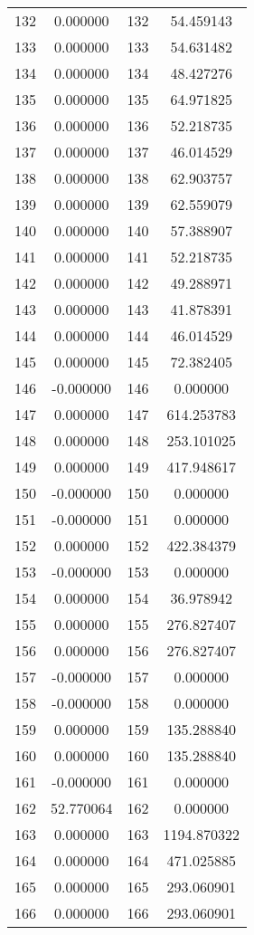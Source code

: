 \documentclass[12pt]{article}
\begin{document}
\begin{longtable}{@{}cccc@{}}
132 & 0.000000 & 132 & 54.459143 \\
133 & 0.000000 & 133 & 54.631482 \\
134 & 0.000000 & 134 & 48.427276 \\
135 & 0.000000 & 135 & 64.971825 \\
136 & 0.000000 & 136 & 52.218735 \\
137 & 0.000000 & 137 & 46.014529 \\
138 & 0.000000 & 138 & 62.903757 \\
139 & 0.000000 & 139 & 62.559079 \\
140 & 0.000000 & 140 & 57.388907 \\
141 & 0.000000 & 141 & 52.218735 \\
142 & 0.000000 & 142 & 49.288971 \\
143 & 0.000000 & 143 & 41.878391 \\
144 & 0.000000 & 144 & 46.014529 \\
145 & 0.000000 & 145 & 72.382405 \\
146 & -0.000000 & 146 & 0.000000 \\
147 & 0.000000 & 147 & 614.253783 \\
148 & 0.000000 & 148 & 253.101025 \\
149 & 0.000000 & 149 & 417.948617 \\
150 & -0.000000 & 150 & 0.000000 \\
151 & -0.000000 & 151 & 0.000000 \\
152 & 0.000000 & 152 & 422.384379 \\
153 & -0.000000 & 153 & 0.000000 \\
154 & 0.000000 & 154 & 36.978942 \\
155 & 0.000000 & 155 & 276.827407 \\
156 & 0.000000 & 156 & 276.827407 \\
157 & -0.000000 & 157 & 0.000000 \\
158 & -0.000000 & 158 & 0.000000 \\
159 & 0.000000 & 159 & 135.288840 \\
160 & 0.000000 & 160 & 135.288840 \\
161 & -0.000000 & 161 & 0.000000 \\
162 & 52.770064 & 162 & 0.000000 \\
163 & 0.000000 & 163 & 1194.870322 \\
164 & 0.000000 & 164 & 471.025885 \\
165 & 0.000000 & 165 & 293.060901 \\
166 & 0.000000 & 166 & 293.060901 \\

\end{longtable}
\end{document}
